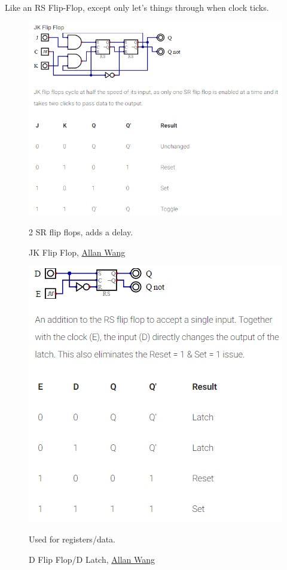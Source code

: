 \documentclass[12 pt]{article}
\begin{document}
	Like an RS Flip-Flop, except only let's things through when clock ticks.
	\begin{figure}[H]
		\caption{JK Flip Flop, \href{https://www.allanwang.ca/notes/mcgill/comp273/0.php}{Allan Wang}}
		\begin{center}
			\includegraphics{jkc}
		\end{center}
		2 SR flip flops, adds a delay.
	\end{figure}
	\begin{figure}[H]
		\caption{D Flip Flop/D Latch, \href{https://www.allanwang.ca/notes/mcgill/comp273/0.php}{Allan Wang}}
		\begin{center}
			\includegraphics{dffl}
		\end{center}
		Used for registers/data.
	\end{figure}
\end{document}
